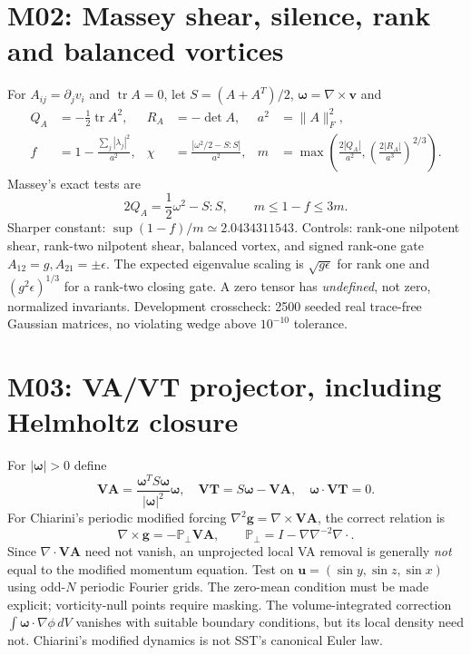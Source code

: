 \documentclass[10pt,a4paper]{article}
\begin{document}
\section{M02: Massey shear, silence, rank and balanced vortices}
For $A_{ij}=\partial_jv_i$ and $\operatorname{tr}A=0$, let $S=(A+A^T)/2$, $\boldsymbol\omega=\nabla\times\mathbf v$ and
\begin{align}
 Q_A&=-\tfrac12\operatorname{tr}A^2,& R_A&=-\det A,& a^2&=\|A\|_F^2,\\
 f&=1-\frac{\sum_j|\lambda_j|^2}{a^2},&
 \chi&=\frac{|\omega^2/2-S:S|}{a^2},&
 m&=\max\left(\frac{2|Q_A|}{a^2},\left(\frac{2|R_A|}{a^3}\right)^{2/3}\right).
\end{align}
Massey's exact tests are
\begin{equation}
 2Q_A=\frac12\omega^2-S:S,\qquad m\leq1-f\leq3m.
\end{equation}
Sharper constant: $\sup(1-f)/m\simeq2.0434311543$. Controls: rank-one nilpotent shear, rank-two nilpotent shear, balanced vortex, and signed rank-one gate $A_{12}=g, A_{21}=\pm\epsilon$. The expected eigenvalue scaling is $\sqrt{g\epsilon}$ for rank one and $(g^2\epsilon)^{1/3}$ for a rank-two closing gate. A zero tensor has \emph{undefined}, not zero, normalized invariants. Development crosscheck: 2500 seeded real trace-free Gaussian matrices, no violating wedge above $10^{-10}$ tolerance.

\section{M03: VA/VT projector, including Helmholtz closure}
For $|\boldsymbol\omega|>0$ define
\begin{equation}
 \mathbf{VA}=\frac{\boldsymbol\omega^TS\boldsymbol\omega}{|\boldsymbol\omega|^2}\boldsymbol\omega,\quad
 \mathbf{VT}=S\boldsymbol\omega-\mathbf{VA},\quad
 \boldsymbol\omega\cdot\mathbf{VT}=0.
\end{equation}
For Chiarini's periodic modified forcing $\nabla^2\mathbf g=\nabla\times\mathbf{VA}$, the correct relation is
\begin{equation}
 \nabla\times\mathbf g=-\mathbb P_\perp\mathbf{VA},\qquad
 \mathbb P_\perp=I-\nabla\nabla^{-2}\nabla\cdot.
\end{equation}
Since $\nabla\cdot\mathbf{VA}$ need not vanish, an unprojected local VA removal is generally \emph{not} equal to the modified momentum equation. Test on $\mathbf u=(\sin y,\sin z,\sin x)$ using odd-$N$ periodic Fourier grids. The zero-mean condition must be made explicit; vorticity-null points require masking. The volume-integrated correction $\int\boldsymbol\omega\cdot\nabla\phi\,dV$ vanishes with suitable boundary conditions, but its local density need not. Chiarini's modified dynamics is not SST's canonical Euler law.
\end{document}
